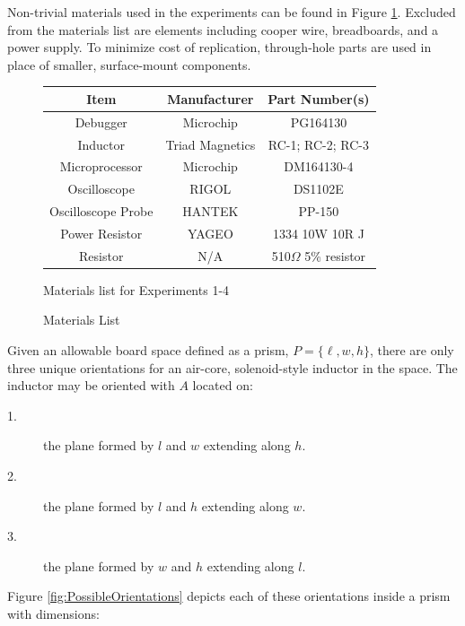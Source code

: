 \documentclass[11pt,oneside]{report}
\begin{document}
    \startappendices
    
    \label{appendix:materials}
    Non-trivial materials used in the experiments can be found in Figure \ref{fig:Materials}. Excluded from the materials list are elements including cooper wire, breadboards, and a power supply. To minimize cost of replication, through-hole parts are used in place of smaller, surface-mount components.
    \begin{figure}[!htbp]
    	\centering	
    	\bgroup
    	\def\arraystretch{1.25}%
    	\begin{tabular}{| c | c | c |}
      		\hline			
      		Item & Manufacturer & Part Number(s)\\ \hline \hline \cline{1-3}
      		Debugger & Microchip & PG164130\\ \hline
      		Inductor & Triad Magnetics & RC-1; RC-2; RC-3\\ \hline
      		Microprocessor & Microchip & DM164130-4\\ \hline
      		Oscilloscope & RIGOL & DS1102E\\ \hline
      		Oscilloscope Probe & HANTEK & PP-150\\  \hline  
      		Power Resistor & YAGEO & 1334 10W 10R J\\  \hline  
      		Resistor & N/A & 510$\Omega$ 5\% resistor\\  \hline  
    	\end{tabular}
    	\egroup
        \caption{Materials List}Materials list for Experiments 1-4
        \label{fig:Materials}
    \end{figure}

    \label{appendix:orientation-visualization}
    Given an allowable board space defined as a prism, $P = \{\ell, w, h\}$, there are only three unique orientations for an air-core, solenoid-style inductor in the space. The inductor may be oriented with $A$ located on:
    \begin{description}
    \item[1.] the plane formed by $l$ and $w$ extending along $h$.
    \item[2.] the plane formed by $l$ and $h$ extending along $w$.
    \item[3.] the plane formed by $w$ and $h$ extending along $l$.
    \end{description}

    Figure \ref{fig:PossibleOrientations} depicts each of these orientations inside a prism with dimensions:
\end{document}
